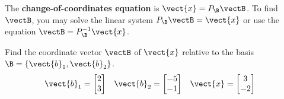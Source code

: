 \begin{boxdef}
	The \textbf{change-of-coordinates equation} is $\vect{x}=P_\B\vectB$. To find $\vectB$, you may solve the linear system $P_\B\vectB=\vect{x}$ or use the equation $\vectB=P_\B^{-1}\vect{x}$.
\end{boxdef}
\begin{exercise} %
	Find the coordinate vector $\vectB$ of $\vect{x}$ relative to the basis $\B=\{\vect{b}_1,\vect{b}_2\}$.
	\begin{align*}
	\vect{b}_1 &= \begin{bmatrix}2\\3\end{bmatrix} &
	\vect{b}_2 &= \begin{bmatrix}-5\\-1\end{bmatrix} &
	\vect{x} &= \begin{bmatrix}3\\-2\end{bmatrix}
	\end{align*}
\end{exercise}
\vfill


